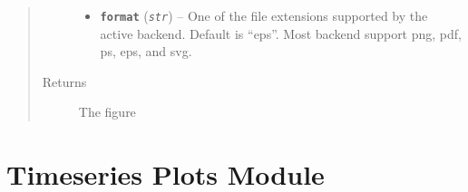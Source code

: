 \documentclass[letterpaper,10pt,english]{sphinxmanual}
\begin{document}
\begin{fulllineitems}
\begin{fulllineitems}
\begin{quote}
\begin{description}
\begin{itemize}
\item {} 
\textbf{\texttt{format}} (\emph{\texttt{str}}) -- One of the file extensions supported by the active
backend. Default is ``eps''. Most backend support png, pdf, ps,
eps, and svg.

\end{itemize}

\item[{Returns}] \leavevmode
The figure

\end{description}\end{quote}

\end{fulllineitems}


\end{fulllineitems}



\chapter{Timeseries Plots Module}
\label{TSPlots::doc}\label{TSPlots:timeseries-plots-module}
\end{document}
